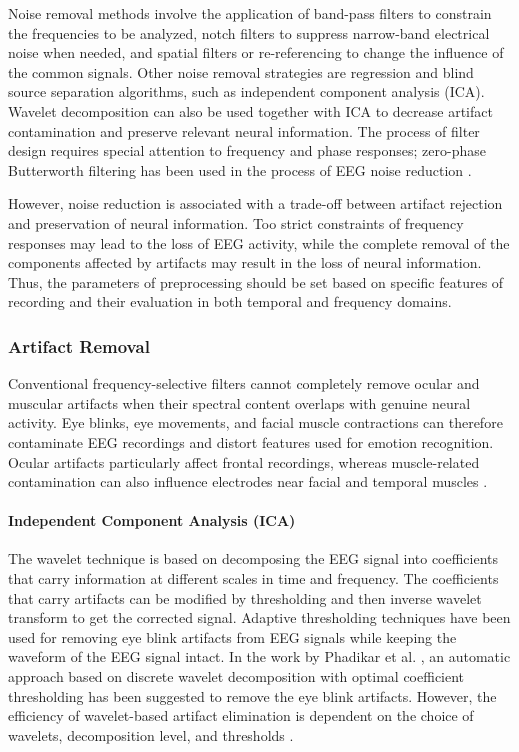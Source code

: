 \documentclass[ASNA,twocolumn]{USG}
\begin{document}
Noise removal methods involve the application of band-pass filters to constrain the frequencies to be analyzed, notch filters to suppress narrow-band electrical noise when needed, and spatial filters or re-referencing to change the influence of the common signals. Other noise removal strategies are regression and blind source separation algorithms, such as independent component analysis (ICA). Wavelet decomposition can also be used together with ICA to decrease artifact contamination and preserve relevant neural information. The process of filter design requires special attention to frequency and phase responses; zero-phase Butterworth filtering has been used in the process of EEG noise reduction \cite{issa2019improved}.

However, noise reduction is associated with a trade-off between artifact rejection and preservation of neural information. Too strict constraints of frequency responses may lead to the loss of EEG activity, while the complete removal of the components affected by artifacts may result in the loss of neural information. Thus, the parameters of preprocessing should be set based on specific features of recording and their evaluation in both temporal and frequency domains.


\subsubsection{Artifact Removal}

Conventional frequency-selective filters cannot completely remove ocular and muscular artifacts when their spectral content overlaps with genuine neural activity. Eye blinks, eye movements, and facial muscle contractions can therefore contaminate EEG recordings and distort features used for emotion recognition. Ocular artifacts particularly affect frontal recordings, whereas muscle-related contamination can also influence electrodes near facial and temporal muscles \cite{jiang2019removal}.

\paragraph{Independent Component Analysis (ICA)}
The wavelet technique is based on decomposing the EEG signal into coefficients that carry information at different scales in time and frequency. The coefficients that carry artifacts can be modified by thresholding and then inverse wavelet transform to get the corrected signal. Adaptive thresholding techniques have been used for removing eye blink artifacts from EEG signals while keeping the waveform of the EEG signal intact. In the work by Phadikar et al. \cite{phadikar2020automatic}, an automatic approach based on discrete wavelet decomposition with optimal coefficient thresholding has been suggested to remove the eye blink artifacts. However, the efficiency of wavelet-based artifact elimination is dependent on the choice of wavelets, decomposition level, and thresholds \cite{issa2019improved}.
\end{document}
